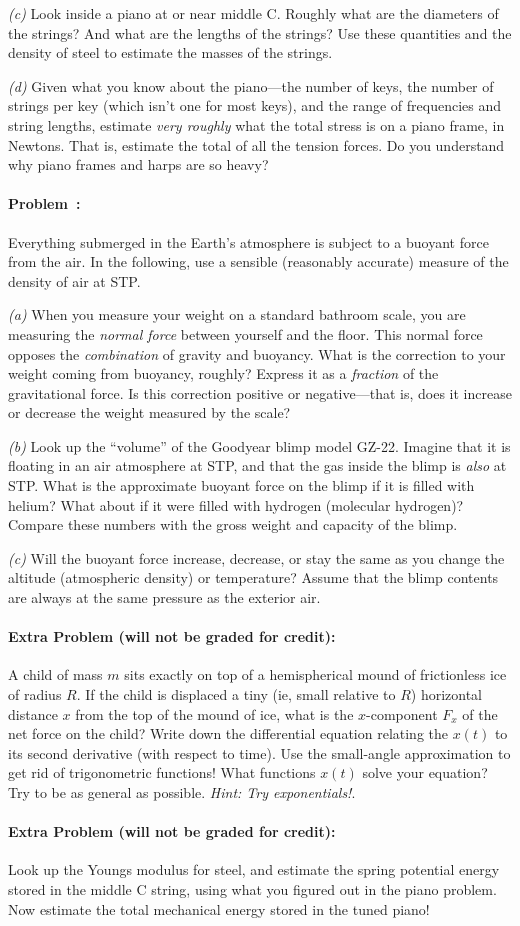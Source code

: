 \documentclass[12pt]{article}
\begin{document}
\textsl{(c)} Look inside a piano at or near middle C. Roughly what are
the diameters of the strings? And what are the lengths of the strings?
Use these quantities and the density of steel to estimate the masses
of the strings.

\textsl{(d)} Given what you know about the piano---the number of keys,
the number of strings per key (which isn't one for most keys), and the
range of frequencies and string lengths, estimate \emph{very roughly}
what the total stress is on a piano frame, in Newtons. That is,
estimate the total of all the tension forces. Do you understand why
piano frames and harps are so heavy?

\paragraph{Problem~\theproblem:}%
Everything submerged in the Earth's atmosphere is subject to a buoyant
force from the air.  In the following, use a sensible (reasonably
accurate) measure of the density of air at STP.

\textsl{(a)} When you measure your weight on a standard bathroom
scale, you are measuring the \emph{normal force} between yourself and
the floor.  This normal force opposes the \emph{combination} of
gravity and buoyancy.  What is the correction to your weight coming
from buoyancy, roughly?  Express it as a \emph{fraction} of the
gravitational force.  Is this correction positive or negative---that
is, does it increase or decrease the weight measured by the scale?

\textsl{(b)} Look up the ``volume'' of the Goodyear blimp model GZ-22.
Imagine that it is floating in an air atmosphere at STP, and that the
gas inside the blimp is \emph{also} at STP.  What is the approximate
buoyant force on the blimp if it is filled with helium?  What about if
it were filled with hydrogen (molecular hydrogen)?  Compare these
numbers with the gross weight and capacity of the blimp.

\textsl{(c)} Will the buoyant force increase, decrease, or stay the
same as you change the altitude (atmospheric density) or temperature?
Assume that the blimp contents are always at the same pressure as the
exterior air.

\paragraph{Extra Problem (will not be graded for credit):}%
A child of mass $m$ sits exactly on top of a hemispherical mound of
frictionless ice of radius $R$.  If the child is displaced a tiny (ie,
small relative to $R$) horizontal distance $x$ from the top of the
mound of ice, what is the $x$-component $F_x$ of the net force on the
child?  Write down the differential equation relating the $x(t)$ to
its second derivative (with respect to time).  Use the small-angle
approximation to get rid of trigonometric functions! What functions
$x(t)$ solve your equation?  Try to be as general as possible.
\emph{Hint: Try exponentials!}.

\paragraph{Extra Problem (will not be graded for credit):}%
Look up the Youngs modulus for steel, and estimate the spring
potential energy stored in the middle C string, using what you figured
out in the piano problem. Now estimate the total mechanical energy
stored in the tuned piano!
\end{document}
